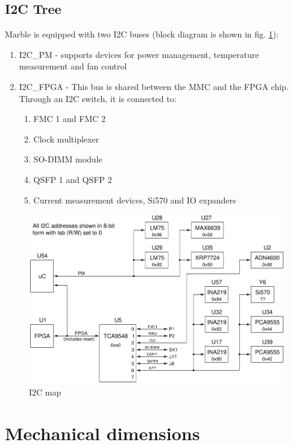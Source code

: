 \documentclass[12pt,oneside,a4]{article}
\begin{document}
\subsection{I2C Tree}
Marble is equipped with two I2C buses (block diagram is shown in fig. \ref{i2c}):
\begin{enumerate}
	\item I2C\_PM - supports devices for power management, temperature measurement and fan control
	\item I2C\_FPGA - This bus is shared between the MMC and the FPGA chip. Through an I2C switch, it is connected to:
	\begin{enumerate}
		\item FMC 1 and FMC 2
		\item Clock multiplexer
		\item SO-DIMM module
		\item QSFP 1 and QSFP 2
		\item Current measurement devices, Si570 and IO expanders
	\end{enumerate}
\end{enumerate}
\begin{figure}[H]
\begin{center}
\includegraphics[width=1\linewidth]{marble2_i2c.png}
 \caption{I2C map}\label{i2c}
\end{center}
\end{figure}

\section{Mechanical dimensions}
\end{document}
